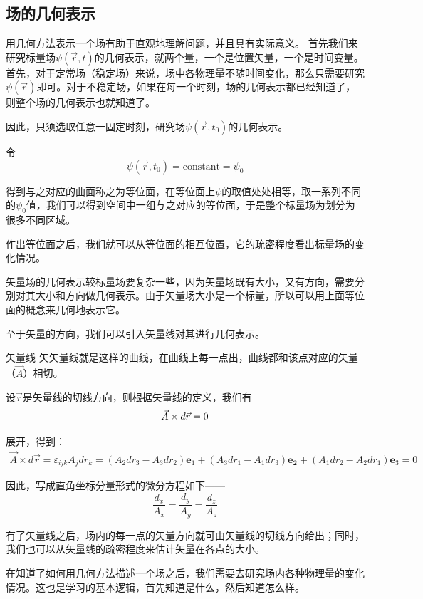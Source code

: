 \documentclass{ctexart}
\begin{document}
\subsection{场的几何表示}
      用几何方法表示一个场有助于直观地理解问题，并且具有实际意义。
      首先我们来研究标量场$\psi(\vec{r},t)$的几何表示，就两个量，一个是位置矢量，一个是时间变量。首先，对于定常场（稳定场）来说，场中各物理量不随时间变化，那么只需要研究$\psi(\vec{r})$即可。对于不稳定场，如果在每一个时刻，场的几何表示都已经知道了，则整个场的几何表示也就知道了。
      \par
      因此，只须选取任意一固定时刻，研究场$\psi(\vec{r},t_0)$的几何表示。\par
      令
      $$
      \psi(\vec{r},t_0)=\text{constant}=\psi_0
      $$
      \par
      得到与之对应的曲面称之为等位面，在等位面上$\psi$的取值处处相等，取一系列不同的$\psi_0$值，我们可以得到空间中一组与之对应的等位面，于是整个标量场为划分为很多不同区域。\par
      作出等位面之后，我们就可以从等位面的相互位置，它的疏密程度看出标量场的变化情况。
      \par
      矢量场的几何表示较标量场要复杂一些，因为矢量场既有大小，又有方向，需要分别对其大小和方向做几何表示。由于矢量场大小是一个标量，所以可以用上面等位面的概念来几何地表示它。
      \par
      至于矢量的方向，我们可以引入矢量线对其进行几何表示。
      \begin{定义}{矢量线}
      矢矢量线就是这样的曲线，在曲线上每一点出，曲线都和该点对应的矢量（$\vec{A}$）相切。\par
      设$\vec{r}$是矢量线的切线方向，则根据矢量线的定义，我们有
      $$
       \vec{A} \times d\vec{r}=0\\
      $$
      \par
      展开，得到：
      $$
\begin{array}{l}
\vec{A} \times d \vec{r}=\varepsilon_{i j k} A_{j} d r_{k}=\left(A_{2} d r_{3}-A_{3} d r_{2}\right) \boldsymbol{e}_{1}+\left(A_{3} d r_{1}-A_{1} d r_{3}\right) \boldsymbol{e_{2}}+\left(A_{1} d r_{2}-A_{2} d r_{1}\right) \boldsymbol{e}_{3}=0
\end{array}
$$
\par
因此，写成直角坐标分量形式的微分方程如下——
$$
\frac{d_{x}}{A_{x}}=\frac{d_{y}}{A_{y}}=\frac{d_{z}}{A_{z}}
$$
\par
有了矢量线之后，场内的每一点的矢量方向就可由矢量线的切线方向给出；同时，我们也可以从矢量线的疏密程度来估计矢量在各点的大小。
\end{定义}
在知道了如何用几何方法描述一个场之后，我们需要去研究场内各种物理量的变化情况。这也是学习的基本逻辑，首先知道是什么，然后知道怎么样。
\end{document}
